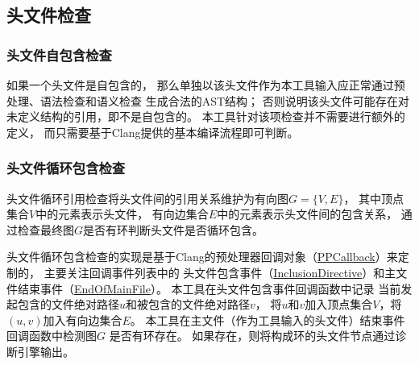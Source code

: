 \subsection{头文件检查}
\label{sec:core:header}

\subsubsection{头文件自包含检查}

如果一个头文件是自包含的，
那么单独以该头文件作为本工具输入应正常通过预处理、语法检查和语义检查
生成合法的AST结构；
否则说明该头文件可能存在对未定义结构的引用，即不是自包含的。
本工具针对该项检查并不需要进行额外的定义，
而只需要基于Clang提供的基本编译流程即可判断。

\subsubsection{头文件循环包含检查}

头文件循环引用检查将头文件间的引用关系维护为有向图$G=\{V,E\}$，
其中顶点集合$V$中的元素表示头文件，
有向边集合$E$中的元素表示头文件间的包含关系，
通过检查最终图$G$是否有环判断头文件是否循环包含。

头文件循环包含检查的实现是基于Clang的预处理器回调对象（\href{https://clang.llvm.org/doxygen/classclang_1_1PPCallbacks.html}{PPCallback}）来定制的，
主要关注回调事件列表中的
头文件包含事件（\href{https://clang.llvm.org/doxygen/classclang_1_1PPCallbacks.html#ad5509ca394c21faaead91ec8add75dd2}{InclusionDirective}）和主文件结束事件（\href{https://clang.llvm.org/doxygen/classclang_1_1PPCallbacks.html#a63e170d069e99bc1c9c7ea0f3bed8bcc}{EndOfMainFile}）。
本工具在头文件包含事件回调函数中记录
当前发起包含的文件绝对路径$u$和被包含的文件绝对路径$v$，
将$u$和$v$加入顶点集合$V$，将$(u,v)$加入有向边集合$E$。
本工具在主文件（作为工具输入的头文件）结束事件回调函数中检测图$G$
是否有环存在。
如果存在，则将构成环的头文件节点通过诊断引擎输出。
